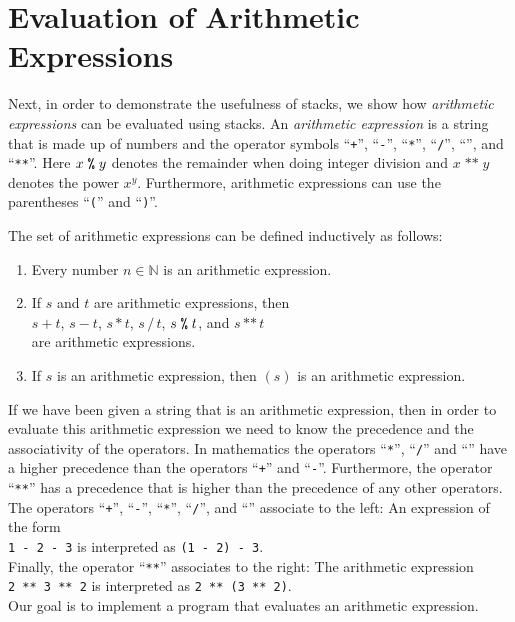 \section{Evaluation of Arithmetic Expressions}
Next, in order to demonstrate the usefulness of stacks, we show how \emph{arithmetic expressions} can be
evaluated using stacks.  An \emph{arithmetic expression} is a string that is made up of numbers and
the operator symbols ``\texttt{+}'', ``\texttt{-}'', ``\texttt{*}'', ``\texttt{/}'',
``\texttt{}'', and ``\texttt{**}''. Here $x \;\texttt{\symbol{37}}\; y$ denotes the remainder when doing
integer division and
$x\;\texttt{**}\;y$ denotes the power $x^y$.    Furthermore, arithmetic expressions can use
the parentheses ``\texttt{(}'' and ``\texttt{)}''.
  
The set of arithmetic expressions can be defined inductively as
follows:
\begin{enumerate}
\item Every number $n \in \mathbb{N}$ is an arithmetic expression.
\item If $s$ and $t$ are arithmetic expressions, then
      \\[0.2cm]
      \hspace*{1.3cm}
      $s + t$, \quad $s - t$, \quad $s * t$, \quad
      $s \,/\, t$, \quad $s \;\texttt{\symbol{37}}\; t$, \quad and \quad $s \,\texttt{**}\, t$
      \\[0.2cm]
      are arithmetic expressions.
\item If $s$ is an arithmetic expression, then $(s)$ is an arithmetic expression.
\end{enumerate}
If we have been given a string that is an arithmetic expression, then in order to evaluate this
arithmetic expression we need to know the precedence and the associativity of the operators.
In mathematics the operators ``\texttt{*}'', ``\texttt{/}'' and ``\texttt{}'' have a
higher precedence than the operators ``\texttt{+}'' and ``\texttt{-}''.  Furthermore, the operator
  ``\texttt{**}'' has a precedence that is higher than the precedence
 of any other operators.  The operators
``\texttt{+}'', ``\texttt{-}'', ``\texttt{*}'', ``\texttt{/}'', and ``\texttt{}''
associate to the left:  An expression of the form 
\\[0.2cm]
\hspace*{1.3cm} 
\texttt{1 - 2 - 3} \quad is interpreted as \quad \texttt{(1 - 2) - 3}.
 \\[0.2cm]
Finally, the operator ``\texttt{**}'' associates to the right:
The arithmetic expression \\[0.2cm]
\hspace*{1.3cm} 
\texttt{2 \texttt{**} 3 \texttt{**}  2} \quad is interpreted as \quad 
\texttt{2 \texttt{**} (3 \texttt{**} 2)}. 
\\[0.2cm]
Our goal is to implement a program that evaluates an arithmetic expression.


